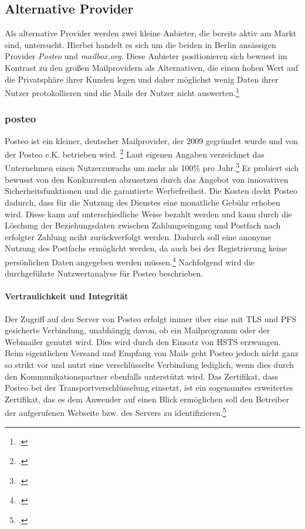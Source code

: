 \documentclass  [paper=a4,
				fontsize=12pt,
				listof=totoc,
				bibliography=totoc
				]{scrreprt}
\begin{document}
			\subsection{Alternative Provider}
			Als alternative Provider werden zwei kleine Anbieter, die bereits aktiv am Markt sind, untersucht.
			Hierbei handelt es sich um die beiden in Berlin ansässigen Provider \textit{Posteo} und \textit{mailbox.org}.
			Diese Anbieter positionieren sich bewusst im Kontrast zu den großen Mailprovidern als Alternativen, die einen hohen Wert auf die Privatsphäre ihrer Kunden legen und daher möglichst wenig Daten ihrer Nutzer protokollieren und die Mails der Nutzer nicht auswerten.\footcite[Vgl.][]{Posteo2013a, Mailbox2014}
			
				\subsubsection{posteo}
				\label{subsubsec:posteo}
					Posteo ist ein kleiner, deutscher Mailprovider, der 2009 gegründet wurde und von der Posteo e.K. betrieben wird. \footcite[Vgl.][]{Posteo2013b}
					Laut eigenen Angaben verzeichnet das Unternehmen einen Nutzerzuwachs um mehr als 100\% pro Jahr.\footcite[Vgl.][]{Posteo2013b}
					Er probiert sich bewusst von den Konkurrenten abzusetzen durch das Angebot von innovativen Sicherheitsfunktionen und die garantierte Werbefreiheit.
					Die Kosten deckt Posteo dadurch, dass für die Nutzung des Dienstes eine monatliche Gebühr erhoben wird.
					Diese kann auf unterschiedliche Weise bezahlt werden und kann durch die Löschung der Beziehungsdaten zwischen Zahlungseingang und Postfach nach erfolgter Zahlung nciht zurückverfolgt werden.
					Dadurch soll eine anonyme Nutzung des Postfachs ermöglicht werden, da auch bei der Registrierung keine persönlichen Daten angegeben werden müssen.\footcite[Vgl.][]{Posteo2013a}
					Nachfolgend wird die durchgeführte Nutzwertanalyse für Posteo beschrieben.
					\medskip\\
					
					\paragraph{Vertraulichkeit und Integrität}
						Der Zugriff auf den Server von Posteo erfolgt immer über eine mit \ac{TLS} und \ac{PFS} gesicherte Verbindung, unabhängig davon, ob ein Mailprogramm oder der Webmailer genutzt wird.
						Dies wird durch den Einsatz von \ac{HSTS} erzwungen.
						Beim eigentlichen Versand und Empfang von Mails geht Posteo jedoch nicht ganz so strikt vor und nutzt eine verschlüsselte Verbindung lediglich, wenn dies durch den Kommunikationspartner ebenfalls unterstützt wird.
						Das Zertifikat, dass Posteo bei der Transportverschlüsselung einsetzt, ist ein sogenanntes erweitertes Zertifikat, das es dem Anwender auf einen Blick ermöglichen soll den Betreiber der aufgerufenen Webseite bzw. des Servers zu identifizieren.\footcite[Vgl.][]{Posteo2013c}\medskip\\
					
\end{document}

